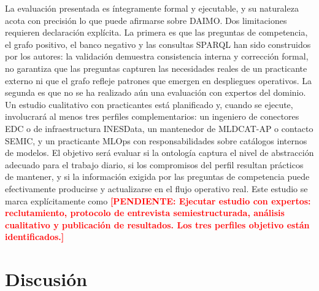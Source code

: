 \documentclass[11pt,a4paper]{article}
\newcommand{\TODO}[1]{\textcolor{red}{\textbf{[PENDIENTE: #1]}}}
\begin{document}
La evaluación presentada es íntegramente formal y ejecutable, y su naturaleza acota con precisión lo que puede afirmarse sobre DAIMO. Dos limitaciones requieren declaración explícita. La primera es que las preguntas de competencia, el grafo positivo, el banco negativo y las consultas SPARQL han sido construidos por los autores: la validación demuestra consistencia interna y corrección formal, no garantiza que las preguntas capturen las necesidades reales de un practicante externo ni que el grafo refleje patrones que emergen en despliegues operativos. La segunda es que no se ha realizado aún una evaluación con expertos del dominio. Un estudio cualitativo con practicantes está planificado y, cuando se ejecute, involucrará al menos tres perfiles complementarios: un ingeniero de conectores EDC o de infraestructura INESData, un mantenedor de MLDCAT-AP o contacto SEMIC, y un practicante MLOps con responsabilidades sobre catálogos internos de modelos. El objetivo será evaluar si la ontología captura el nivel de abstracción adecuado para el trabajo diario, si los compromisos del perfil resultan prácticos de mantener, y si la información exigida por las preguntas de competencia puede efectivamente producirse y actualizarse en el flujo operativo real. Este estudio se marca explícitamente como \TODO{Ejecutar estudio con expertos: reclutamiento, protocolo de entrevista semiestructurada, análisis cualitativo y publicación de resultados. Los tres perfiles objetivo están identificados.}

\section{Discusión}\label{sec:discussion}
\end{document}
